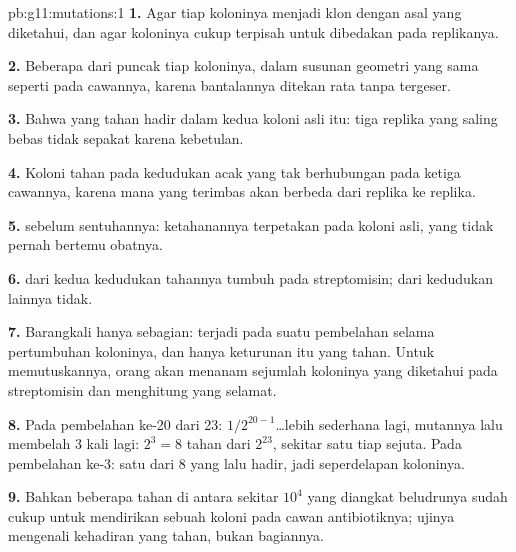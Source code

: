 \begin{solution}{pb:g11:mutations:1}
\textbf{1.} Agar tiap koloninya menjadi klon dengan asal yang
diketahui, dan agar koloninya cukup terpisah untuk dibedakan pada
replikanya.

\textbf{2.} Beberapa  dari puncak tiap koloninya, dalam susunan
geometri yang sama seperti pada cawannya, karena bantalannya ditekan
rata tanpa tergeser.

\textbf{3.} Bahwa  yang tahan hadir dalam kedua koloni asli itu:
tiga replika yang saling bebas tidak sepakat karena kebetulan.

\textbf{4.} Koloni tahan pada kedudukan acak yang tak berhubungan pada
ketiga cawannya, karena  mana yang terimbas akan berbeda dari
replika ke replika.

\textbf{5.}  sebelum sentuhannya: ketahanannya terpetakan pada
koloni asli, yang tidak pernah bertemu obatnya.

\textbf{6.}  dari kedua kedudukan tahannya tumbuh pada
streptomisin;  dari kedudukan lainnya tidak.

\textbf{7.} Barangkali hanya sebagian:  terjadi pada suatu
pembelahan selama pertumbuhan koloninya, dan hanya keturunan  itu
yang tahan. Untuk memutuskannya, orang akan menanam sejumlah 
koloninya yang diketahui pada streptomisin dan menghitung yang selamat.

\textbf{8.} Pada pembelahan ke-20 dari 23: $1/2^{20-1}$\dots lebih
sederhana lagi,  mutannya lalu membelah 3 kali lagi: $2^3 = 8$ 
tahan dari $2^{23}$, sekitar satu tiap sejuta. Pada pembelahan ke-3:
satu dari 8  yang lalu hadir, jadi seperdelapan koloninya.

\textbf{9.} Bahkan beberapa  tahan di antara sekitar $10^4$  yang
diangkat beludrunya sudah cukup untuk mendirikan sebuah koloni pada
cawan antibiotiknya; ujinya mengenali kehadiran  yang tahan, bukan
bagiannya.


\end{solution}
